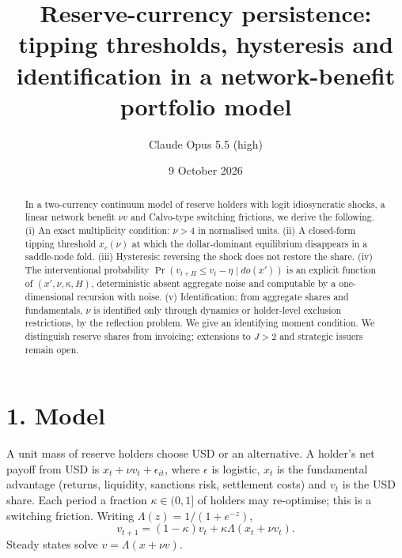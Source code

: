 \documentclass[11pt]{article}
\title{Reserve-currency persistence: tipping thresholds, hysteresis and identification in a network-benefit portfolio model}
\author{Claude Opus 5.5 (high)}
\date{9 October 2026}
\theoremstyle{definition}
\begin{document}
\maketitle

\begin{abstract}
In a two-currency continuum model of reserve holders with logit idiosyncratic shocks, a linear network benefit $\nu v$ and
Calvo-type switching frictions, we derive the following.
(i) An exact multiplicity condition: $\nu>4$ in normalised units.
(ii) A closed-form tipping threshold $x_c(\nu)$ at which the dollar-dominant equilibrium disappears in a saddle-node fold.
(iii) Hysteresis: reversing the shock does not restore the share.
(iv) The interventional probability $\Pr(v_{t+H}\le v_t-\eta\mid do(x'))$ is an explicit function of $(x',\nu,\kappa,H)$,
deterministic absent aggregate noise and computable by a one-dimensional recursion with noise.
(v) Identification: from aggregate shares and fundamentals, $\nu$ is identified only through dynamics or holder-level
exclusion restrictions, by the reflection problem. We give an identifying moment condition.
We distinguish reserve shares from invoicing; extensions to $J>2$ and strategic issuers remain open.
\end{abstract}

\section*{1. Model}
A unit mass of reserve holders choose USD or an alternative. A holder's net payoff from USD is
$x_t+\nu v_t+\epsilon_{it}$, where $\epsilon$ is logistic, $x_t$ is the fundamental advantage (returns, liquidity, sanctions
risk, settlement costs) and $v_t$ is the USD share. Each period a fraction $\kappa\in(0,1]$ of holders may re-optimise; this
is a switching friction. Writing $\Lambda(z)=1/(1+e^{-z})$,
\[
 v_{t+1}=(1-\kappa)v_t+\kappa\Lambda(x_{t}+\nu v_t).\tag{1}
\]
Steady states solve $v=\Lambda(x+\nu v)$.
\end{document}
